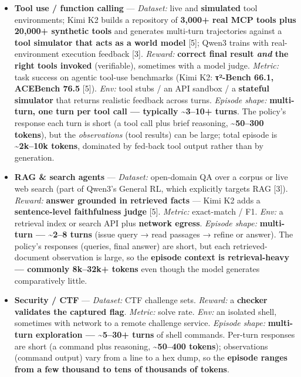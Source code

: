 \documentclass[
  paper=a4,
  ,captions=tableheading
]{scrartcl}
\providecommand{\tightlist}{%
  \setlength{\itemsep}{0pt}\setlength{\parskip}{0pt}}
\begin{document}
\begin{itemize}
\tightlist
\item
  \textbf{Tool use / function calling} --- \emph{Dataset:} live and
  \textbf{simulated} tool environments; Kimi K2 builds a repository of
  \textbf{3,000+ real MCP tools plus 20,000+ synthetic tools} and
  generates multi-turn trajectories against a \textbf{tool simulator
  that acts as a world model} {[}5{]}; Qwen3 trains with
  real-environment execution feedback {[}3{]}. \emph{Reward:}
  \textbf{correct final result \emph{and} the right tools invoked}
  (verifiable), sometimes with a model judge. \emph{Metric:} task
  success on agentic tool-use benchmarks (Kimi K2: \textbf{τ²-Bench
  66.1, ACEBench 76.5} {[}5{]}). \emph{Env:} tool stubs / an API sandbox
  / a \textbf{stateful simulator} that returns realistic feedback across
  turns. \emph{Episode shape:} \textbf{multi-turn, one turn per tool
  call --- typically \textasciitilde3--10+ turns}. The policy's response
  each turn is short (a tool call plus brief reasoning,
  \textbf{\textasciitilde50--300 tokens}), but the \emph{observations}
  (tool results) can be large; total episode is
  \textbf{\textasciitilde2k--10k tokens}, dominated by fed-back tool
  output rather than by generation.
\item
  \textbf{RAG \& search agents} --- \emph{Dataset:} open-domain QA over
  a corpus or live web search (part of Qwen3's General RL, which
  explicitly targets RAG {[}3{]}). \emph{Reward:} \textbf{answer
  grounded in retrieved facts} --- Kimi K2 adds a \textbf{sentence-level
  faithfulness judge} {[}5{]}. \emph{Metric:} exact-match / F1.
  \emph{Env:} a retrieval index or search API plus \textbf{network
  egress}. \emph{Episode shape:} \textbf{multi-turn ---
  \textasciitilde2--8 turns} (issue query → read passages → refine or
  answer). The policy's responses (queries, final answer) are short, but
  each retrieved-document observation is large, so the \textbf{episode
  context is retrieval-heavy --- commonly 8k--32k+ tokens} even though
  the model generates comparatively little.
\item
  \textbf{Security / CTF} --- \emph{Dataset:} CTF challenge sets.
  \emph{Reward:} a \textbf{checker validates the captured flag}.
  \emph{Metric:} solve rate. \emph{Env:} an isolated shell, sometimes
  with network to a remote challenge service. \emph{Episode shape:}
  \textbf{multi-turn exploration --- \textasciitilde5--30+ turns} of
  shell commands. Per-turn responses are short (a command plus
  reasoning, \textbf{\textasciitilde50--400 tokens}); observations
  (command output) vary from a line to a hex dump, so the
  \textbf{episode ranges from a few thousand to tens of thousands of
  tokens}.
\end{itemize}
\end{document}
